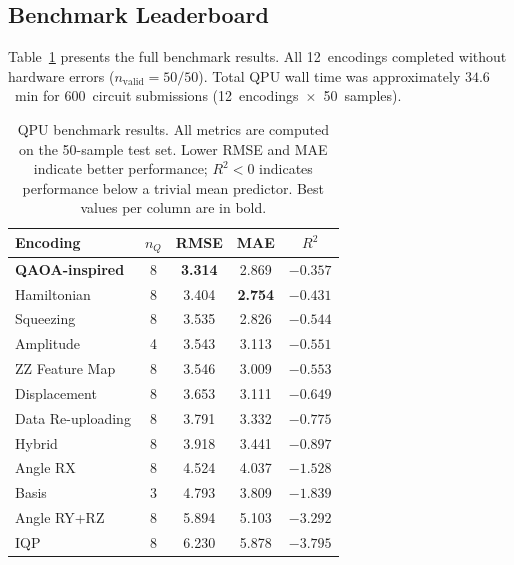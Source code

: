 \documentclass[twocolumn,aps,pra,superscriptaddress,floatfix]{revtex4-2}
\begin{document}
\subsection{Benchmark Leaderboard}

Table~\ref{tab:results} presents the full benchmark results.
All 12~encodings completed without hardware errors ($n_\text{valid}=50/50$).
Total QPU wall time was approximately $34.6$~min for
600~circuit submissions (12~encodings~$\times$~50~samples).

\begin{table}[ht]
\centering
\caption{%
  QPU benchmark results. All metrics are computed on the 50-sample test set.
  Lower RMSE and MAE indicate better performance;
  $R^2<0$ indicates performance below a trivial mean predictor.
  Best values per column are in bold.
}
\label{tab:results}
\renewcommand{\arraystretch}{1.15}
\begin{tabular}{@{}lcccc@{}}
\toprule
\textbf{Encoding} & $n_Q$ & \textbf{RMSE} & \textbf{MAE} & $R^2$ \\
\midrule
\textbf{QAOA-inspired}   & 8 & \textbf{3.314} & 2.869         & $-0.357$ \\
Hamiltonian              & 8 & 3.404          & \textbf{2.754}& $-0.431$ \\
Squeezing                & 8 & 3.535          & 2.826         & $-0.544$ \\
Amplitude                & 4 & 3.543          & 3.113         & $-0.551$ \\
ZZ Feature Map           & 8 & 3.546          & 3.009         & $-0.553$ \\
Displacement             & 8 & 3.653          & 3.111         & $-0.649$ \\
Data Re-uploading        & 8 & 3.791          & 3.332         & $-0.775$ \\
Hybrid                   & 8 & 3.918          & 3.441         & $-0.897$ \\
Angle RX                 & 8 & 4.524          & 4.037         & $-1.528$ \\
Basis                    & 3 & 4.793          & 3.809         & $-1.839$ \\
Angle RY+RZ              & 8 & 5.894          & 5.103         & $-3.292$ \\
IQP                      & 8 & 6.230          & 5.878         & $-3.795$ \\
\bottomrule
\end{tabular}
\end{table}
\end{document}
